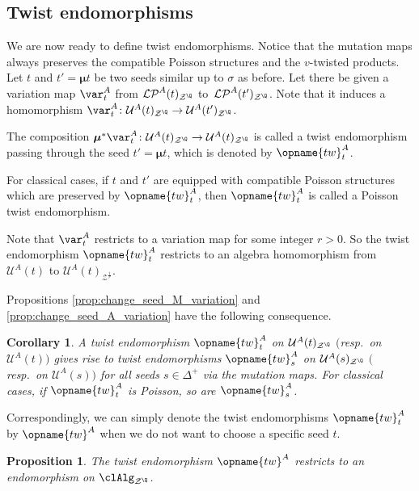 \documentclass[pdftex]{sigma}
\renewcommand{\tw}{\opname{tw}}
\newcommand{\upClAlg}{\mathcal{U}^A}
\newcommand{\LP}{{\mathcal{LP}}}
\newcommand{\fFac}{\mathcal{Z}}
\newcommand{\fFacRoot}{\fFac^{\Q}}
\newcommand{\seq}{\boldsymbol{\mu}}%
\renewcommand{\tw}{\opname{tw}}
\numberwithin{equation}{section}
\newtheorem{Corollary}[Theorem]{Corollary}
\newtheorem{Proposition}[Theorem]{Proposition}
 { \theoremstyle{definition}
\newtheorem{Definition}[Theorem]{Definition}
\newtheorem{Note}[Theorem]{Note}
\newtheorem{Example}[Theorem]{Example}
\newtheorem{Remark}[Theorem]{Remark}
\newtheorem{Assumption}[Theorem]{Assumption}
}
\begin{document}
\subsection{Twist endomorphisms}

We are now ready to define twist endomorphisms. Notice that the mutation
maps always preserves the compatible Poisson structures and the $v$-twisted products. Let $t$ and $t'=\seq t$ be two
seeds similar up to $\sigma$ as before. Let there be given a variation
map $\var_{t}^{A}$ from $\LP^{A}(t)_{\fFacRoot}$ to~$\LP^{A}(t')_{\fFacRoot}$.
Note that it induces a homomorphism $\var_{t}^{A}\colon\upClAlg(t)_{\fFacRoot}\rightarrow \upClAlg(t')_{\fFacRoot}$.

\begin{Definition}
The composition $\seq^{*}\var_{t}^{A}\colon\upClAlg(t)_{\fFacRoot}\rightarrow\upClAlg(t)_{\fFacRoot}$
is called a twist endomorphism passing through the seed $t'=\seq t$, which
is denoted by $\tw_{t}^{A}$.

For classical cases, if $t$ and $t'$ are equipped with compatible Poisson structures
which are preserved by $\tw_{t}^{A}$, then $\tw_{t}^{A}$ is called
a Poisson twist endomorphism.
\end{Definition}

Note that $\var_{t}^{A}$ restricts to a variation map \smash{$\var_{t}^{A}\colon\LP(t)\rightarrow\LP(t')_{\fFac^{\frac{1}{r}}}$}
for some integer $r>0$. So the twist endomorphism $\tw_{t}^{A}$
restricts to an algebra homomorphism from $\upClAlg(t)$ to $\upClAlg(t)_{\fFac^{\frac{1}{r}}}$.

Propositions \ref{prop:change_seed_M_variation} and \ref{prop:change_seed_A_variation}
have the following consequence.

\begin{Corollary}
A twist endomorphism $\tw_{t}^{A}$ on $\upClAlg(t)_{\fFacRoot}$ $($resp.\ on $\upClAlg(t))$ gives rise to twist endomorphisms $\tw_{s}^{A}$ on
$\upClAlg(s)_{\fFacRoot}$ $($resp.\ on $\upClAlg(s))$ for all seeds $s\in\Delta^{+}$
via the mutation maps. For classical cases, if $\tw_{t}^{A}$ is Poisson,
so are $\tw_{s}^{A}$.
\end{Corollary}

Correspondingly, we can simply denote the twist endomorphisms $\tw_{t}^{A}$
by $\tw^{A}$ when we do not want to choose a specific seed $t$.

\begin{Proposition}\label{prop:A_variation_map_restrict_cluster_alg}
The twist endomorphism $\tw^{A}$ restricts to an endomorphism
on $\clAlg_{\fFacRoot}$.
\end{Proposition}
\end{document}
